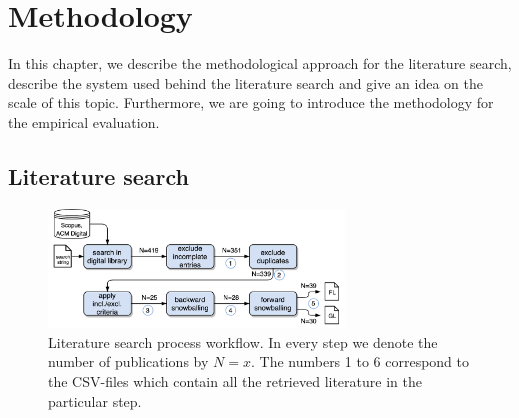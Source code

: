 
\chapter{Methodology}
\label{ch:methodology}

In this chapter, we describe the methodological approach for the literature search, describe the system used behind the literature search and give an idea on the scale of this topic. Furthermore, we are going to introduce the methodology for the empirical evaluation.


\section{Literature search} \label{appendix:method:search}

\begin{figure} %
 \centering
 \includegraphics[width = 0.7\textwidth]{images/search-process.png}
 \caption{Literature search process workflow. In every step we denote the number of publications by $N=x$. The numbers 1 to 6 correspond to the CSV-files which contain all the retrieved literature in the particular step.}
 \label{fig:search-process}
\end{figure}

